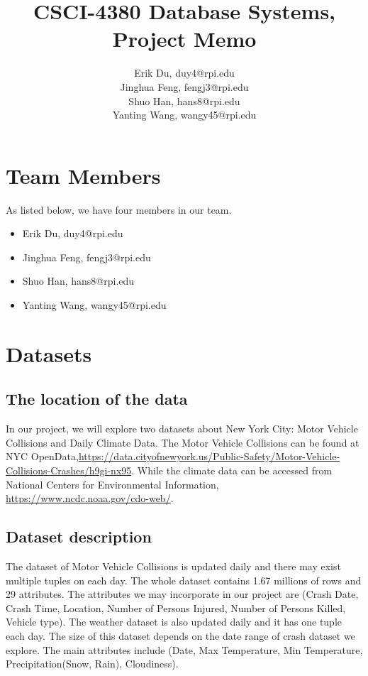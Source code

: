 \documentclass{article}
\title{CSCI-4380 Database Systems, Project Memo}
\author{Erik Du, duy4@rpi.edu\\
	Jinghua Feng, fengj3@rpi.edu\\
	Shuo Han, hans8@rpi.edu\\
	Yanting Wang, wangy45@rpi.edu}
\begin{document}
\maketitle
\section{Team Members}
As listed below, we have four members in our team.
\begin{itemize}
	\item Erik Du, duy4@rpi.edu
	\item Jinghua Feng, fengj3@rpi.edu
	\item Shuo Han, hans8@rpi.edu
	\item Yanting Wang, wangy45@rpi.edu
\end{itemize}
\section{Datasets}
\subsection{The location of the data}
In our project, we will explore two datasets about New York City: Motor Vehicle Collisions and Daily Climate Data.
The Motor Vehicle Collisions can be found at NYC OpenData,\url{https://data.cityofnewyork.us/Public-Safety/Motor-Vehicle-Collisions-Crashes/h9gi-nx95}. While the climate data can be accessed from National Centers for Environmental Information, \url{https://www.ncdc.noaa.gov/cdo-web/}.

\subsection{ Dataset description }
The dataset of Motor Vehicle Collisions is updated daily and there may exist multiple tuples on each day. The whole dataset contains 1.67 millions of rows and 29 attributes. The attributes we may incorporate in our project are 
(Crash Date, Crash Time, Location, Number of Persons Injured, Number of Persons Killed, Vehicle type).
\newline\newline
\noindent The weather dataset is also updated daily and it has one tuple each day. The size of this dataset depends on the date range of crash dataset we explore. The main attributes include (Date, Max Temperature, Min Temperature, Precipitation(Snow, Rain), Cloudiness).
\end{document}
